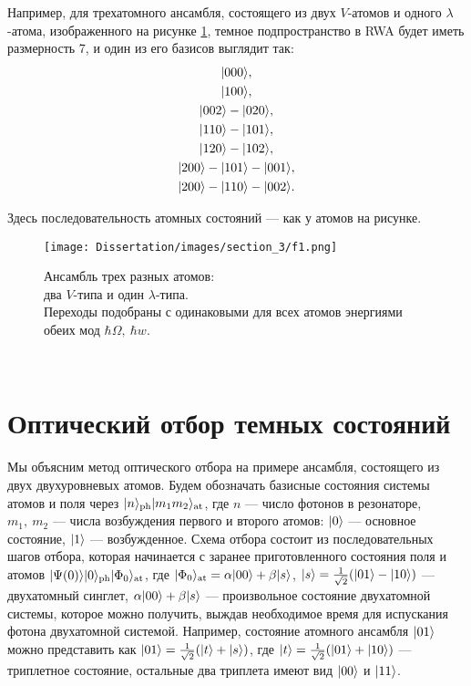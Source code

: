 Например, для трехатомного ансамбля, состоящего из двух $V$-атомов и одного $\lambda$-атома, изображенного на рисунке \ref{fig:three}, темное подпространство в RWA \cite{ozhigov_qq, rwa_1, rwa_2} будет иметь размерность 7, и один из его базисов выглядит так:
\begin{gather}
	|000\rangle,\notag\\
	|100\rangle,\notag\\
	|002\rangle - |020\rangle,\notag\\
	|110\rangle - |101\rangle,\notag\\ 
	|120\rangle - |102\rangle,\notag\\
	|200\rangle - |101\rangle - |001\rangle,\notag\\
	|200\rangle - |110\rangle - |002\rangle.\notag
\end{gather}

\noindent Здесь последовательность атомных состояний --- как у атомов на рисунке. 

\clearpage
\begin{figure}
	\noindent\centering\texttt{[image: Dissertation/images/section\_3/f1.png]}
	\captionsetup{format=hang,width=0.8\textwidth,justification=centering,singlelinecheck=no}
	\\[6pt]
	\caption{Ансамбль трех разных атомов:\\два $V$-типа и один $\lambda$-типа.\\ Переходы подобраны с одинаковыми для всех атомов энергиями обеих мод $\hbar\Omega,\ \hbar w$.}
	\label{fig:three}
\end{figure}
\
\section{Оптический отбор темных состояний}\label{sec:ch3/sect3}
Мы объясним метод оптического отбора на примере ансамбля, состоящего из двух двухуровневых атомов. Будем обозначать базисные состояния системы атомов и поля через $|n\rangle_{\text{ph}}|m_1m_2\rangle_{\text{at}}$, где $n$ --- число фотонов в резонаторе, $m_1,~m_2$ --- числа возбуждения первого и второго атомов: $|0\rangle$ --- основное состояние, $|1\rangle$ --- возбужденное. Схема отбора состоит из последовательных шагов отбора, которая начинается с заранее приготовленного состояния поля и атомов $|\Psi(0)\rangle|0\rangle_{\text{ph}}|\Phi_0\rangle_{\text{at}}$, где $|\Phi_{0}\rangle_{\text{at}}=\alpha |00\rangle+\beta |s\rangle$, $|s\rangle=\frac{1}{\sqrt{2}}(|01\rangle - |10\rangle)$ --- двухатомный синглет, $\alpha |00\rangle+\beta |s\rangle$ --- произвольное состояние двухатомной системы, которое можно получить, выждав необходимое время для испускания фотона двухатомной системой. Например, состояние атомного ансамбля $|01\rangle$ можно представить как $|01\rangle=\frac{1}{\sqrt 2}(|t\rangle+|s\rangle)$, где $|t\rangle=\frac{1}{\sqrt{2}}(|01\rangle+|10\rangle)$ --- триплетное состояние, остальные два триплета имеют вид $|00\rangle$ и $|11\rangle$. 

